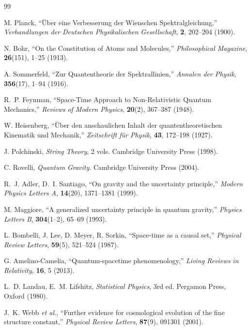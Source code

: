 ﻿\documentclass[12pt,a4paper]{article}
\theoremstyle{plain}
\theoremstyle{definition}
\theoremstyle{remark}
\begin{document}
\begin{thebibliography}{99}

M. Planck, ``Über eine Verbesserung der Wienschen Spektralgleichung,''
\textit{Verhandlungen der Deutschen Physikalischen Gesellschaft}, \textbf{2}, 202--204 (1900).

N. Bohr, ``On the Constitution of Atoms and Molecules,''
\textit{Philosophical Magazine}, \textbf{26}(151), 1--25 (1913).

A. Sommerfeld, ``Zur Quantentheorie der Spektrallinien,''
\textit{Annalen der Physik}, \textbf{356}(17), 1--94 (1916).

R.~P. Feynman, ``Space-Time Approach to Non-Relativistic Quantum Mechanics,''
\textit{Reviews of Modern Physics}, \textbf{20}(2), 367--387 (1948).

W. Heisenberg, ``Über den anschaulichen Inhalt der quantentheoretischen Kinematik und
Mechanik,'' \textit{Zeitschrift für Physik}, \textbf{43}, 172--198 (1927).

J. Polchinski, \textit{String Theory}, 2 vols. Cambridge University Press (1998).

C. Rovelli, \textit{Quantum Gravity}. Cambridge University Press (2004).

R.~J. Adler, D.~I. Santiago, ``On gravity and the uncertainty principle,''
\textit{Modern Physics Letters A}, \textbf{14}(20), 1371--1381 (1999).

M. Maggiore, ``A generalized uncertainty principle in quantum gravity,''
\textit{Physics Letters B}, \textbf{304}(1--2), 65--69 (1993).

L. Bombelli, J. Lee, D. Meyer, R. Sorkin, ``Space-time as a causal set,''
\textit{Physical Review Letters}, \textbf{59}(5), 521--524 (1987).

G. Amelino-Camelia, ``Quantum-spacetime phenomenology,''
\textit{Living Reviews in Relativity}, \textbf{16}, 5 (2013).

L.~D. Landau, E.~M. Lifshitz, \textit{Statistical Physics}, 3rd ed.
Pergamon Press, Oxford (1980).

J.~K. Webb \textit{et al.}, ``Further evidence for cosmological evolution of the fine
structure constant,'' \textit{Physical Review Letters}, \textbf{87}(9), 091301 (2001).


\end{thebibliography}
\end{document}
